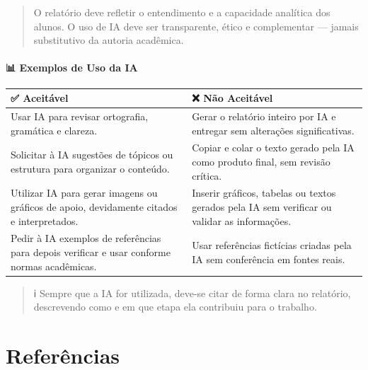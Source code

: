 \documentclass[
  a4paper,
]{book}
\begin{document}
\begin{quote}
O relatório deve refletir o entendimento e a capacidade analítica dos
alunos. O uso de IA deve ser transparente, ético e complementar ---
jamais substitutivo da autoria acadêmica.
\end{quote}

\subsubsection{📊 Exemplos de Uso da IA}\label{exemplos-de-uso-da-ia}

\begin{longtable}[]{@{}
  >{\raggedright\arraybackslash}p{}
  >{\raggedright\arraybackslash}p{}@{}}
\toprule\noalign{}
\begin{minipage}[b]{\linewidth}\raggedright
✅ Aceitável
\end{minipage} & \begin{minipage}[b]{\linewidth}\raggedright
❌ Não Aceitável
\end{minipage} \\
\midrule\noalign{}
\endhead
\bottomrule\noalign{}
\endlastfoot
Usar IA para revisar ortografia, gramática e clareza. & Gerar o
relatório inteiro por IA e entregar sem alterações significativas. \\
Solicitar à IA sugestões de tópicos ou estrutura para organizar o
conteúdo. & Copiar e colar o texto gerado pela IA como produto final,
sem revisão crítica. \\
Utilizar IA para gerar imagens ou gráficos de apoio, devidamente citados
e interpretados. & Inserir gráficos, tabelas ou textos gerados pela IA
sem verificar ou validar as informações. \\
Pedir à IA exemplos de referências para depois verificar e usar conforme
normas acadêmicas. & Usar referências fictícias criadas pela IA sem
conferência em fontes reais. \\
\end{longtable}

\begin{quote}
ℹ️ Sempre que a IA for utilizada, deve-se citar de forma clara no
relatório, descrevendo como e em que etapa ela contribuiu para o
trabalho.
\end{quote}


\chapter*{Referências}\label{referuxeancias}
\end{document}
